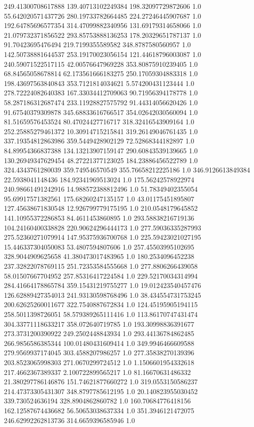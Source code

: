 249.41300708617888	139.40713102249384	198.32097729872606	1.0
55.642020571437726	280.19733782664485	224.27246445907687	1.0
192.64785696577354	314.47099882340956	131.69179314658066	1.0
21.079732371856522	293.85753888136253	178.20329651787137	1.0
91.70423695476494	219.7199355589582	348.8787580560957	1.0
142.50738881644537	253.19170023056154	121.44618796003087	1.0
240.59071522517115	42.00576647969228	353.80875910239405	1.0
68.84565058678814	62.173561666183275	250.17059304883318	1.0
198.43697563840843	353.7121814034621	5.574200431123444	1.0
278.72224082640383	167.33034412709063	90.71956394178778	1.0
58.287186312687474	233.11928827575792	91.44314056620426	1.0
91.67540379309878	345.68833616766517	354.02642030560094	1.0
81.51659576453524	80.47024427716717	318.32416543909164	1.0
252.25885279461372	10.30914715215841	319.26149046761435	1.0
337.19354812863986	359.5449428902129	72.52868344182897	1.0
84.89954366837388	134.13213907159147	290.60843539139665	1.0
130.26949347629454	48.27221377123025	184.23886456522789	1.0
324.4343761280039	359.749546570549	355.76658212225186	1.0
346.9126613849384	22.5938041148436	184.92341969513024	1.0
175.56242578922974	240.98661491242916	14.988572388812496	1.0
51.78349402355054	95.69917571382561	175.68260247135157	1.0
43.01175451895807	127.45638671830548	12.926799779175195	1.0
210.0548179645852	141.10955372286853	84.4611453860895	1.0
293.58838216719136	104.24160400338828	220.90624296444173	1.0
277.59036335287993	275.52360271079914	147.95375936700768	1.0
225.59423021027195	15.446337304050083	53.4807594807606	1.0
257.45503995102695	328.9044909625658	41.380473017483965	1.0
180.2534096452238	237.32822078769115	251.72353584555668	1.0
277.8806266439058	58.01507667704952	257.85316417224584	1.0
229.52170034314994	284.41664178865784	359.15431219755277	1.0
19.012423540457476	126.62889427354013	241.93130598768496	1.0
38.434554731753245	200.62625260011677	322.7540887672834	1.0
124.45195905194115	258.5011398726051	58.579389265111416	1.0
113.86170747431474	304.33771118633217	358.072640719785	1.0
193.30998836391677	273.3731200390922	249.2502448843934	1.0
293.44136784862485	266.9856586385344	100.01480431609414	1.0
349.9946466609588	279.9569937174045	303.4588207986257	1.0
277.35838270139396	203.8523065998303	271.0670299724512	1.0
1.1506601954332618	217.4662367389337	2.100722899565217	1.0
81.16670631486332	21.380297786146876	151.74621877660272	1.0
319.0553150586237	214.47373305431307	348.8797785612195	1.0
20.140823955030452	339.730524636194	328.8904862860782	1.0
160.70684776418156	162.12587674436682	56.50653038637334	1.0
351.3946121472075	246.62992262813736	314.6659396585946	1.0
